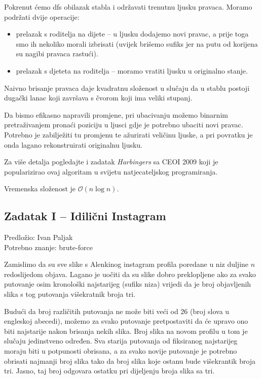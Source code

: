\documentclass[a4paper]{article}
\begin{document}
Pokrenut ćemo dfs obilazak stabla i održavati trenutnu ljusku pravaca. Moramo
podržati dvije operacije:

\begin{itemize}
  \item prelazak s roditelja na dijete -- u ljusku dodajemo novi pravac, a prije
        toga smo ih nekoliko morali izbrisati (uvijek brišemo sufiks jer na putu
        od korijena su nagibi pravaca rastući).
  \item prelazak s djeteta na roditelja -- moramo vratiti ljusku u originalno stanje.
\end{itemize}

Naivno brisanje pravaca daje kvadratnu složenost u slučaju da u stablu postoji
dugački lanac koji završava s čvorom koji ima veliki stupanj.

Da bismo efikasno napravili promjene, pri ubacivanju možemo binarnim
pretraživanjem pronaći poziciju u ljusci gdje je potrebno ubaciti novi pravac.
Potrebno je zabilježiti tu promjenu te ažurirati veličinu ljuske, a pri povratku
je onda lagano rekonstruirati originalnu ljusku.

Za više detalja pogledajte i zadatak \textit{Harbingers} sa CEOI 2009 koji je
popularizirao ovaj algoritam u svijetu natjecateljskog programiranja.

Vremenska složenost je $\mathcal{O}(n \log{}n)$.

\clearpage

\subsection*{Zadatak I -- Idilični Instagram}
\textsf{Predložio: Ivan Paljak}\\
\textsf{Potrebno znanje: brute-force}

Zamislimo da su sve slike s Alenkinog instagram profila poredane u niz duljine
$n$ redoslijedom objava. Lagano je uočiti da su slike dobro preklopljene ako za
svako putovanje osim kronološki najstarijeg (sufiks niza) vrijedi da je broj
objavljenih slika s tog putovanja višekratnik broja tri.

Budući da broj različitih putovanja ne može biti veći od $26$ (broj slova u
engleskoj abecedi), možemo za svako putovanje pretpostaviti da će upravo ono
biti najstarije nakon brisanja nekih slika. Broj slika na novom profilu u tom je
slučaju jedinstveno određen. Sva starija putovanja od fiksiranog najstarijeg
moraju biti u potpunosti obrisana, a za svako novije putovanje je potrebno
obrisati najmanji broj slika tako da broj slika koje ostanu bude višekrantik
broja tri. Jasno, taj broj odgovara ostatku pri dijeljenju broja slika sa tri.
\end{document}
